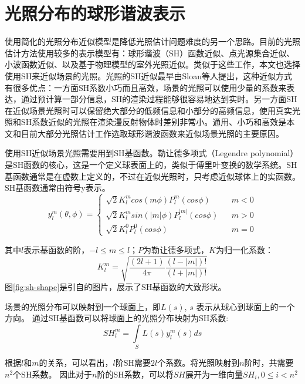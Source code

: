 \section{光照分布的球形谐波表示}
使用简化的光照分布近似模型是降低光照估计问题难度的另一个思路。目前的光照估计方法使用较多的表示模型有：球形谐波（SH）函数近似、点光源集合近似、小波函数近似、以及基于物理模型的室外光照近似。类似于这些工作，本文也选择使用SH来近似场景的光照。光照的SH近似最早由Sloan等人\cite{sloan2002precomputed}提出，这种近似方式有很多优点：一方面SH系数小巧而且高效，场景的光照可以使用少量的系数来表达，通过预计算一部分信息，SH的渲染过程能够很容易地达到实时。另一方面SH在近似场景光照时可以保留绝大部分的低频信息和小部分的高频信息，使用真实光照和SH系数近似的光照在渲染漫反射物体时差别非常小。通用、小巧和高效是本文和目前大部分光照估计工作选取球形谐波函数来近似场景光照的主要原因。

使用SH近似场景光照需要用到SH基函数。勒让德多项式（Legendre polynomial）是SH函数的核心，这是一个定义球表面上的，类似于傅里叶变换的数学系统。SH基函数通常是在虚数上定义的，不过在近似光照时，只考虑近似球体上的实函数。SH基函数通常由符号y表示。
\begin{equation}
y^m_l(\theta, \phi)=\left\{
    \begin{array}{lcl}
        \sqrt{2}K^m_lcos(m\phi)P^m_l(cos\phi) & & {m<0}\\
        \sqrt{2}K^m_lsin(|m|\phi)P^|m|_l(cos\phi) & & {m>0}\\
        \sqrt{2}K^0_lP^0_l(cos\phi) & & {m=0}
    \end{array} \right. 
\end{equation}

其中$l$表示基函数的阶，$-l \leq m \leq l$；$P$为勒让德多项式，$K$为归一化系数：
\begin{equation}
    K^m_l=\sqrt{\frac{(2l+1)}{4\pi}\frac{(l-|m|)!}{(l+|m|)!}}
\end{equation}
图\ref{fig:sh-shape}是引自\cite{green2003spherical}的图片，展示了SH基函数的大致形状。



场景的光照分布可以映射到一个球面上，即$L(s)$, $s$ 表示从球心到球面上的一个方向。
通过SH基函数可以将球面上的光照分布映射为SH系数:
\begin{equation}
    SH^m_l = \int\limits_{S}L(s)y^m_l(s)ds
\end{equation}

根据$l$和$m$的关系，可以看出，$l$阶SH需要$2l$个系数。将光照映射到$n$阶时，共需要$n^2$个SH系数。
因此对于$n$阶的SH系数，可以将$SH$展开为一维向量$SH_i, 0 \leq i < n^2$

